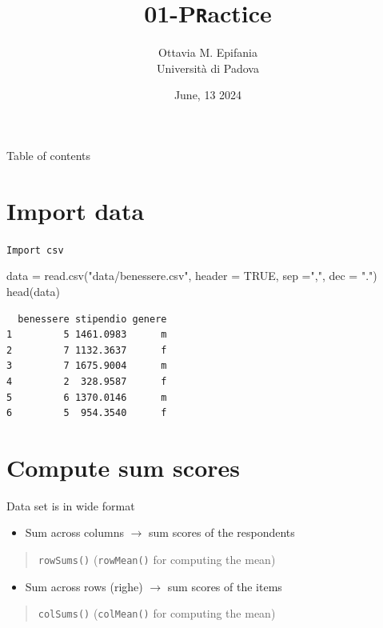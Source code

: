 \documentclass[
  ignorenonframetext,
]{beamer}
\title{01-P\texttt{R}actice}
\author{Ottavia M. Epifania\\
Università di Padova}
\date{June, 13 2024}
\institute{Lezione di Dottorato @Università Cattolica del Sacro Cuore
(MI)}
\newenvironment{Shaded}{\begin{snugshade}}{\end{snugshade}}
\newcommand{\AttributeTok}[1]{\textcolor[rgb]{0.00,0.34,0.68}{#1}}
\newcommand{\ConstantTok}[1]{\textcolor[rgb]{0.67,0.33,0.00}{#1}}
\newcommand{\FunctionTok}[1]{\textcolor[rgb]{0.39,0.29,0.61}{#1}}
\newcommand{\NormalTok}[1]{\textcolor[rgb]{0.12,0.11,0.11}{#1}}
\newcommand{\OtherTok}[1]{\textcolor[rgb]{0.00,0.43,0.16}{#1}}
\newcommand{\StringTok}[1]{\textcolor[rgb]{0.75,0.01,0.01}{#1}}
\providecommand{\tightlist}{%
  \setlength{\itemsep}{0pt}\setlength{\parskip}{0pt}}
\begin{document}
\frame{\titlepage}

\begin{frame}{Table of contents}
\protect\hypertarget{table-of-contents}{}
\tableofcontents
\end{frame}

\hypertarget{import-data}{%
\section{Import data}\label{import-data}}

\begin{frame}[fragile]{\texttt{Import\ csv}}
\protect\hypertarget{import-csv}{}
\begin{Shaded}
\begin{Highlighting}[]
\NormalTok{data }\OtherTok{=} \FunctionTok{read.csv}\NormalTok{(}\StringTok{"data/benessere.csv"}\NormalTok{, }
                \AttributeTok{header =} \ConstantTok{TRUE}\NormalTok{, }
                \AttributeTok{sep =}\StringTok{","}\NormalTok{, }\AttributeTok{dec =} \StringTok{"."}\NormalTok{)}
\FunctionTok{head}\NormalTok{(data)}
\end{Highlighting}
\end{Shaded}

\begin{verbatim}
  benessere stipendio genere
1         5 1461.0983      m
2         7 1132.3637      f
3         7 1675.9004      m
4         2  328.9587      f
5         6 1370.0146      m
6         5  954.3540      f
\end{verbatim}
\end{frame}

\hypertarget{compute-sum-scores}{%
\section{Compute sum scores}\label{compute-sum-scores}}

\begin{frame}[fragile]{}
\protect\hypertarget{section}{}
Data set is in wide format

\begin{itemize}
\tightlist
\item
  Sum across columns \(\rightarrow\) sum scores of the respondents
\end{itemize}

\begin{quote}
\texttt{rowSums()} (\texttt{rowMean()} for computing the mean)
\end{quote}

\begin{itemize}
\tightlist
\item
  Sum across rows (righe) \(\rightarrow\) sum scores of the items
\end{itemize}

\begin{quote}
\texttt{colSums()} (\texttt{colMean()} for computing the mean)
\end{quote}
\end{frame}
\end{document}
